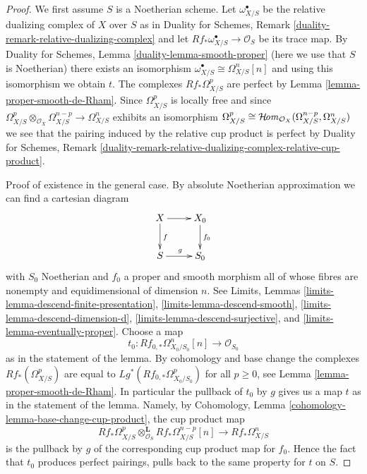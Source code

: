 \begin{proof}
We first assume $S$ is a Noetherian scheme.
Let $\omega^\bullet_{X/S}$ be the relative dualizing complex of $X$ over $S$ as
in Duality for Schemes, Remark \ref{duality-remark-relative-dualizing-complex}
and let $Rf_*\omega_{X/S}^\bullet \to \mathcal{O}_S$ be its trace map. By
Duality for Schemes, Lemma \ref{duality-lemma-smooth-proper}
(here we use that $S$ is Noetherian)
there exists an isomorphism $\omega^\bullet_{X/S} \cong \Omega^n_{X/S}[n]$
and using this isomorphism we obtain $t$. The complexes $Rf_*\Omega^p_{X/S}$
are perfect by Lemma \ref{lemma-proper-smooth-de-Rham}.
Since $\Omega^p_{X/S}$ is locally free and since
$\Omega^p_{X/S} \otimes_{\mathcal{O}_X} \Omega^{n - p}_{X/S} \to
\Omega^n_{X/S}$ exhibits an isomorphism $\Omega^p_{X/S} \cong
\mathop{\mathcal{H}\!\mathit{om}}\nolimits_{\mathcal{O}_X}(\Omega^{n - p}_{X/S}, \Omega^n_{X/S})$
we see that the pairing induced by the relative cup product is perfect by
Duality for Schemes, Remark
\ref{duality-remark-relative-dualizing-complex-relative-cup-product}.

\medskip\noindent
Proof of existence in the general case.
By absolute Noetherian approximation we can find a cartesian diagram
$$
\xymatrix{
X \ar[r] \ar[d]^f & X_0 \ar[d]^{f_0} \\
S \ar[r]^g & S_0
}
$$
with $S_0$ Noetherian and $f_0$ a proper and smooth morphism
all of whose fibres are nonempty and equidimensional of dimension $n$.
See Limits, Lemmas \ref{limits-lemma-descend-finite-presentation},
\ref{limits-lemma-descend-smooth}, \ref{limits-lemma-descend-dimension-d},
\ref{limits-lemma-descend-surjective}, and
\ref{limits-lemma-eventually-proper}. Choose a map
$$
t_0 : Rf_{0, *}\Omega^n_{X_0/S_0}[n] \longrightarrow \mathcal{O}_{S_0}
$$
as in the statement of the lemma. By cohomology and base change the
complexes $Rf_*(\Omega^p_{X/S})$ are equal to
$Lg^*(Rf_{0, *}\Omega^p_{X_0/S_0})$ for all $p \geq 0$, see
Lemma \ref{lemma-proper-smooth-de-Rham}. In particular the pullback
of $t_0$ by $g$ gives us a map $t$ as in the statement of the lemma.
Namely, by Cohomology, Lemma \ref{cohomology-lemma-base-change-cup-product},
the cup product map
$$
Rf_*\Omega^p_{X/S}
\otimes_{\mathcal{O}_S}^\mathbf{L}
Rf_*\Omega^{n - p}_{X/S}[n]
\longrightarrow
Rf_*\Omega^n_{X/S}
$$
is the pullback by $g$ of the corresponding cup product map for $f_0$.
Hence the fact that $t_0$ produces perfect pairings, pulls back to
the same property for $t$ on $S$.


\end{proof}

